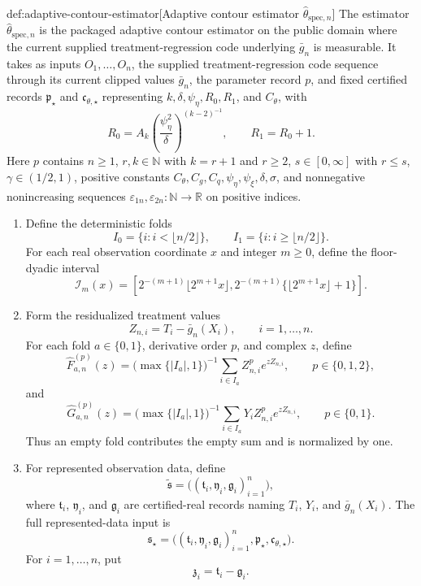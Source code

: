 \documentclass[11pt]{article}
\begin{document}
\begin{algorithmv}{def:adaptive-contour-estimator}[Adaptive contour estimator \(\widehat\theta_{\mathrm{spec},n}\)]
The estimator \(\widehat\theta_{\mathrm{spec},n}\) is the packaged adaptive contour estimator on the public domain where the current supplied treatment-regression code underlying \(\bar g_n\) is measurable. It takes as inputs \(O_1,\ldots,O_n\), the supplied treatment-regression code sequence through its current clipped values \(\bar g_n\), the parameter record \(p\), and fixed certified records \(\mathfrak p_{\star}\) and \(\mathfrak c_{\theta,\star}\) representing \(k,\delta,\psi_{\eta},R_0,R_1\), and \(C_{\theta}\), with
\[
R_0=A_k\left(\frac{\psi_{\eta}^2}{\delta}\right)^{(k-2)^{-1}},
\qquad
R_1=R_0+1.
\]
Here \(p\) contains \(n\ge1\), \(r,k\in\mathbb N\) with \(k=r+1\) and \(r\ge2\), \(s\in[0,\infty]\) with \(r\le s\), \(\gamma\in(1/2,1)\), positive constants \(C_{\theta},C_g,C_q,\psi_{\eta},\psi_{\xi},\delta,\sigma\), and nonnegative nonincreasing sequences \(\varepsilon_{1n},\varepsilon_{2n}:\mathbb N\to\mathbb R\) on positive indices.

\begin{enumerate}
\item Define the deterministic folds
\[
I_0=\{i:i<\lfloor n/2\rfloor\},
\qquad
I_1=\{i:i\ge\lfloor n/2\rfloor\}.
\]
For each real observation coordinate \(x\) and integer \(m\ge0\), define the floor-dyadic interval
\[
\mathcal I_m(x)=
\left[
2^{-(m+1)}\lfloor2^{m+1} x\rfloor,
2^{-(m+1)}\{\lfloor2^{m+1} x\rfloor+1\}
\right].
\]

\item Form the residualized treatment values
\[
Z_{n,i}=T_i-\bar g_n(X_i),
\qquad i=1,\ldots,n.
\]
For each fold \(a\in\{0,1\}\), derivative order \(p\), and complex \(z\), define
\[
\widehat F_{a,n}^{(p)}(z)
=
\bigl(\max\{|I_a|,1\}\bigr)^{-1}\sum_{i\in I_a}Z_{n,i}^{p}e^{zZ_{n,i}},
\qquad p\in\{0,1,2\},
\]
and
\[
\widehat G_{a,n}^{(p)}(z)
=
\bigl(\max\{|I_a|,1\}\bigr)^{-1}\sum_{i\in I_a}Y_iZ_{n,i}^{p}e^{zZ_{n,i}},
\qquad p\in\{0,1\}.
\]
Thus an empty fold contributes the empty sum and is normalized by one.

\item For represented observation data, define
\[
\widetilde{\mathfrak s}
=
\bigl((\mathfrak t_i,\mathfrak y_i,\mathfrak g_i)_{i=1}^n\bigr),
\]
where \(\mathfrak t_i\), \(\mathfrak y_i\), and \(\mathfrak g_i\) are certified-real records naming \(T_i\), \(Y_i\), and \(\bar g_n(X_i)\). The full represented-data input is
\[
\mathfrak s_{\star}
=
\bigl((\mathfrak t_i,\mathfrak y_i,\mathfrak g_i)_{i=1}^n,
\mathfrak p_{\star},\mathfrak c_{\theta,\star}\bigr).
\]
For \(i=1,\ldots,n\), put
\[
\mathfrak z_i=\mathfrak t_i-\mathfrak g_i.
\]


\end{enumerate}
\end{algorithmv}
\end{document}
